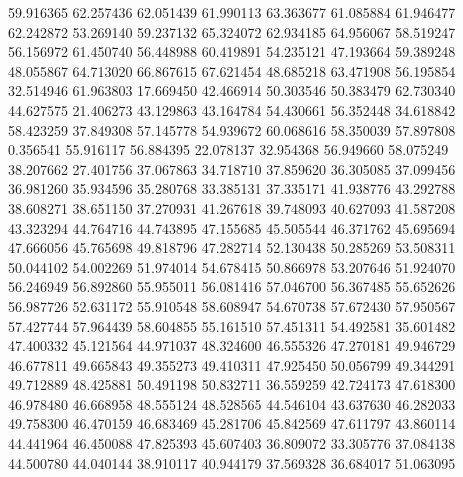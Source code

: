 59.916365
62.257436
62.051439
61.990113
63.363677
61.085884
61.946477
62.242872
53.269140
59.237132
65.324072
62.934185
64.956067
58.519247
56.156972
61.450740
56.448988
60.419891
54.235121
47.193664
59.389248
48.055867
64.713020
66.867615
67.621454
48.685218
63.471908
56.195854
32.514946
61.963803
17.669450
42.466914
50.303546
50.383479
62.730340
44.627575
21.406273
43.129863
43.164784
54.430661
56.352448
34.618842
58.423259
37.849308
57.145778
54.939672
60.068616
58.350039
57.897808
0.356541
55.916117
56.884395
22.078137
32.954368
56.949660
58.075249
38.207662
27.401756
37.067863
34.718710
37.859620
36.305085
37.099456
36.981260
35.934596
35.280768
33.385131
37.335171
41.938776
43.292788
38.608271
38.651150
37.270931
41.267618
39.748093
40.627093
41.587208
43.323294
44.764716
44.743895
47.155685
45.505544
46.371762
45.695694
47.666056
45.765698
49.818796
47.282714
52.130438
50.285269
53.508311
50.044102
54.002269
51.974014
54.678415
50.866978
53.207646
51.924070
56.246949
56.892860
55.955011
56.081416
57.046700
56.367485
55.652626
56.987726
52.631172
55.910548
58.608947
54.670738
57.672430
57.950567
57.427744
57.964439
58.604855
55.161510
57.451311
54.492581
35.601482
47.400332
45.121564
44.971037
48.324600
46.555326
47.270181
49.946729
46.677811
49.665843
49.355273
49.410311
47.925450
50.056799
49.344291
49.712889
48.425881
50.491198
50.832711
36.559259
42.724173
47.618300
46.978480
46.668958
48.555124
48.528565
44.546104
43.637630
46.282033
49.758300
46.470159
46.683469
45.281706
45.842569
47.611797
43.860114
44.441964
46.450088
47.825393
45.607403
36.809072
33.305776
37.084138
44.500780
44.040144
38.910117
40.944179
37.569328
36.684017
51.063095
